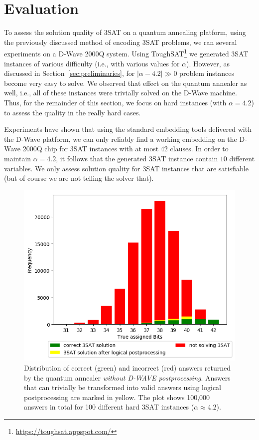 
\section{Evaluation}
\label{sec:evaluation}

To assess the solution quality of 3SAT on a quantum annealing platform, using the previously discussed method of encoding 3SAT problems, we ran several experiments on a D-Wave 2000Q system. Using ToughSAT\footnote{\url{https://toughsat.appspot.com/}} we generated 3SAT instances of various difficulty (i.e., with various values for $\alpha$). However, as discussed in Section~\ref{sec:preliminaries}, for $|\alpha - 4.2| \gg 0$ problem instances become very easy to solve. We observed that effect on the quantum annealer as well, i.e., all of these instances were trivially solved on the D-Wave machine. Thus, for the remainder of this section, we focus on hard instances (with $\alpha = 4.2$) to assess the quality in the really hard cases. 

Experiments have shown that using the standard embedding tools delivered with the D-Wave platform, we can only reliably find a working embedding on the D-Wave 2000Q chip for 3SAT instances with at most $42$ clauses. In order to maintain $\alpha = 4.2$, it follows that the generated 3SAT instance contain $10$ different variables. We only assess solution quality for 3SAT instances that are satisfiable (but of course we are not telling the solver that).

\begin{figure}
\centering
\includegraphics[width=.8\textwidth]{../material_2/Plots/42_4_2_def_engl_color_mit_transform.png}
\caption{Distribution of correct (green) and incorrect (red) answers returned by the quantum annealer \emph{without D-WAVE postprocessing}. Answers that can trivially be transformed into valid answers using logical postprocessing are marked in yellow. The plot shows 100,000 answers in total for 100 different hard 3SAT instances ($\alpha \approx 4.2$).}
\label{fig:distr-no-pp}
\end{figure}

